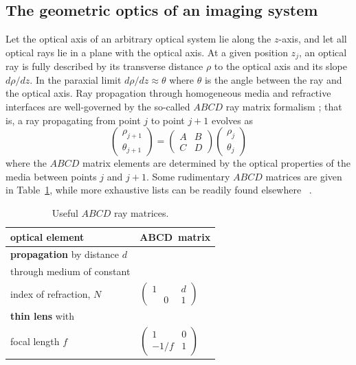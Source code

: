 \subsection{The geometric optics of an imaging system}
Let the optical axis of an arbitrary optical system lie along the $z$-axis,
and let all optical rays lie in a plane with the optical axis.
At a given position $z_j$, an optical ray is fully described by
its transverse distance $\rho$ to the optical axis and
its slope $d\rho / dz$.
In the paraxial limit $d\rho / dz \approx \theta$
where $\theta$ is the angle between the ray and the optical axis.
Ray propagation through homogeneous media and refractive interfaces
are well-governed by the so-called $ABCD$ ray matrix formalism
\cite[Ch.~15]{siegman_lasers};
that is, a ray propagating from point $j$ to point $j + 1$ evolves as
\begin{equation}
  \begin{pmatrix}
    \rho_{j + 1}
    \\
    \theta_{j + 1}
  \end{pmatrix}
  =
  \begin{pmatrix}
    A & B
    \\
    C & D
  \end{pmatrix}
  \begin{pmatrix}
    \rho_j
    \\
    \theta_j
  \end{pmatrix}
  \label{eq:InterferometricMethods:ABCD_ray_tracing_general}
\end{equation}
where the $ABCD$ matrix elements are determined
by the optical properties of the media between points $j$ and $j + 1$.
Some rudimentary $ABCD$ matrices are given in
Table~\ref{table:InterferometricMethods:ABCD_matrices}, while
more exhaustive lists can be readily found elsewhere
\cite[Ch.~15]{siegman_lasers}~\cite{tovar_generalized_beam_matrices_IV}.

\begin{table}
  \centering
  \renewcommand{\arraystretch}{1.5}%
  \begin{tabular}{%
    >{\centering}m{6cm} >{\centering}m{4.5cm}
  }
    \toprule%
    \textbf{optical element} & $\mathbf{ABCD}$~\textbf{matrix}
    \tabularnewline%
    \midrule
    \textbf{propagation} by distance $d$ \\
    through medium of constant \\
    index of refraction, $N$
    &
    $\begin{pmatrix}
      1 & d
      \\
      \phantom{-} 0 \phantom{f} & 1  %
    \end{pmatrix}$
    \tabularnewline%
    \textbf{thin lens} with \\
    focal length $f$
    &
    $\begin{pmatrix}
      1 & 0
      \\
      -1/f & 1
    \end{pmatrix}$
    \tabularnewline%
    \toprule%
  \end{tabular}
  \caption[Useful $ABCD$ ray matrices]{Useful $ABCD$ ray matrices.}
\label{table:InterferometricMethods:ABCD_matrices}
\end{table}

